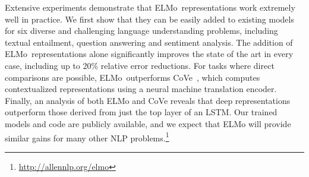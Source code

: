 \documentclass[11pt,a4paper]{article}
\newcommand{\ELMO}{ELMo}
\newcommand\micomment[1]{\textcolor{red}{\textbf{[#1] --\textsc{MI}}}}
\begin{document}
Extensive experiments demonstrate that \ELMO\ representations work extremely well in practice.
We first show that they can be easily added to existing models for six diverse and challenging language understanding problems, including textual entailment, question answering and sentiment analysis.
The addition of \ELMO\ representations alone significantly improves the state of the art in every case, including up to 20\% relative error reductions.
For tasks where direct comparisons are possible, \ELMO\ outperforms CoVe~\citep{McCann2017LearnedIT}, which computes contextualized representations using a neural machine translation encoder.
Finally, an analysis of both \ELMO{} and CoVe reveals that deep representations outperform those derived from just the top layer of an LSTM.
Our trained models and code are publicly available, and we expect that ELMo will provide similar gains for many other NLP problems.\footnote{\url{http://allennlp.org/elmo}}

 



\end{document}
